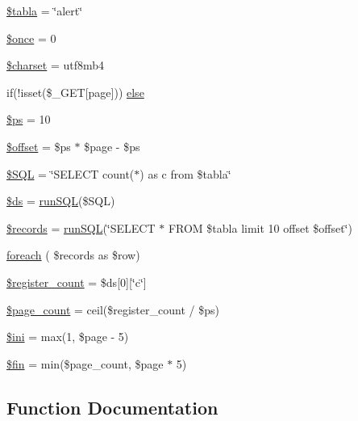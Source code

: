 \begin{DoxyCompactItemize}
\item 
\hyperlink{alerts_8php_a729c521d99d919a188fcf3ce7ea8abf4}{\$tabla} = \char`\"{}alert\char`\"{}
\item 
\hyperlink{alerts_8php_af9497eccfad417dbeb146a552754ba58}{\$once} = 0
\item 
\hyperlink{alerts_8php_af10158dd74b75f1d337e83102d6b82ce}{\$charset} = \textquotesingle{}utf8mb4\textquotesingle{}
\item 
if(!isset(\$\+\_\+\+G\+ET\mbox{[}\textquotesingle{}page\textquotesingle{}\mbox{]})) \hyperlink{alerts_8php_a0ac1dc775b5200ca1ce7b5e63b96a90f}{else}
\item 
\hyperlink{alerts_8php_a8b6b390e5bb7f76108892860e4996a29}{\$ps} = 10
\item 
\hyperlink{alerts_8php_aec4de82415d7f05cb9748d12d3a95a87}{\$offset} = \$ps $\ast$ \$page -\/ \$ps
\item 
\hyperlink{alerts_8php_af257545da465befb663591fd6fbe85ce}{\$\+S\+QL} = \char`\"{}S\+E\+L\+E\+CT count($\ast$) as c from \$tabla\char`\"{}
\item 
\hyperlink{alerts_8php_a1812a4caf64434b22b146b17c25560f2}{\$ds} = \hyperlink{run__sql_8php_a508906286211b4a6c5c393195505b870}{run\+S\+QL}(\$S\+QL)
\item 
\hyperlink{alerts_8php_a6cb1988642ff4f03fdfb3658cdd14fa0}{\$records} = \hyperlink{run__sql_8php_a508906286211b4a6c5c393195505b870}{run\+S\+QL}(\char`\"{}S\+E\+L\+E\+CT $\ast$ F\+R\+OM \$tabla limit 10 offset \$offset\char`\"{})
\item 
\hyperlink{alerts_8php_a54dfda288ab58a7bf7fb40f0ca668433}{foreach} ( \$records as \$row)
\item 
\hyperlink{alerts_8php_a8ac13a7cbfa3465f0b70fc4c1b23ff1a}{\$register\+\_\+count} = \$ds\mbox{[}0\mbox{]}\mbox{[}\char`\"{}c\char`\"{}\mbox{]}
\item 
\hyperlink{alerts_8php_af8ca4a6d8480351bd32e1b25dcbf9276}{\$page\+\_\+count} = ceil(\$register\+\_\+count / \$ps)
\item 
\hyperlink{alerts_8php_a8f5f30fbe4092bf20ba2fcae8197ab09}{\$ini} = max(1, \$page -\/ 5)
\item 
\hyperlink{alerts_8php_aca415ddf942e2a996eb5a5bdeeb7a41f}{\$fin} = min(\$page\+\_\+count, \$page $\ast$ 5)
\end{DoxyCompactItemize}


\subsection{Function Documentation}
\hypertarget{alerts_8php_a39cc6d68da40b461170d87a183c6d08e}{}\label{alerts_8php_a39cc6d68da40b461170d87a183c6d08e} 
